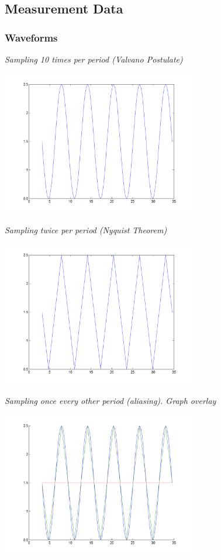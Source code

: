 \documentclass[twoside]{article}
\begin{document}
\subsection{Measurement Data}
\subsubsection{Waveforms}
\centerline{\emph{Sampling 10 times per period (Valvano Postulate)}}
\includegraphics[height=2.5in, width=\textwidth]{valvano_postulate}
\vskip 0.1in
\centerline{\emph{Sampling twice per period (Nyquist Theorem)}}
\includegraphics[height=2.5in, width=\textwidth]{nyquist_only}
\vskip 0.1in
\centerline{\emph{Sampling once every other period (aliasing). Graph overlay}}
\includegraphics[height=2.5in, width=\textwidth]{nyquist_sampling_plot}
\vskip 0.1in
\end{document}

